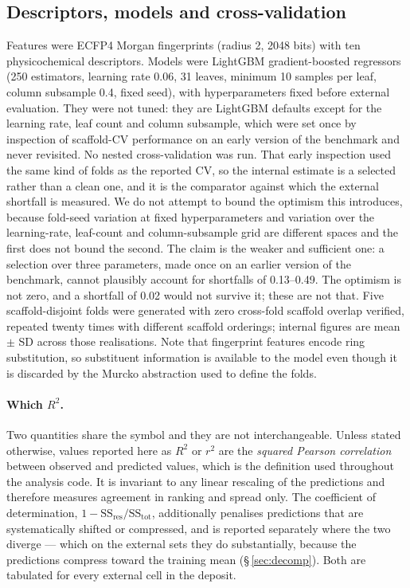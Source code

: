 \documentclass[11pt,a4paper]{article}
\begin{document}
\subsection{Descriptors, models and cross-validation}
Features were ECFP4 Morgan fingerprints \cite{Rogers2010} (radius 2, 2048 bits) with ten
physicochemical descriptors. Models were LightGBM \cite{Ke2017} gradient-boosted regressors (250 estimators, learning
rate 0.06, 31 leaves, minimum 10 samples per leaf, column subsample 0.4, fixed seed),
with hyperparameters fixed before external evaluation. They were not tuned: they are
LightGBM defaults except for the learning rate, leaf count and column subsample, which
were set once by inspection of scaffold-CV performance on an early version of the
benchmark and never revisited. No nested cross-validation was run. That early inspection
used the same kind of folds as the reported CV, so the internal estimate is a selected
rather than a clean one, and it is the comparator against which the external shortfall is
measured. We do not attempt to bound the optimism this
introduces, because fold-seed variation at fixed hyperparameters and variation over the
learning-rate, leaf-count and column-subsample grid are different spaces and the first
does not bound the second. The claim is the weaker and sufficient one: a selection over
three parameters, made once on an earlier version of the benchmark, cannot plausibly
account for shortfalls of 0.13--0.49. The optimism is not zero, and a shortfall of 0.02
would not survive it; these are not that. Five scaffold-disjoint folds
were generated with zero cross-fold scaffold overlap verified, repeated twenty times
with different scaffold orderings; internal figures are mean $\pm$ SD across those
realisations. Note that fingerprint features encode ring substitution, so substituent
information is available to the model even though it is discarded by the Murcko
abstraction used to define the folds.

\paragraph{Which $R^{2}$.} Two quantities share the symbol and they are not
interchangeable. Unless stated otherwise, values reported here as $R^{2}$ or $r^{2}$
are the \emph{squared Pearson correlation} between observed and predicted values, which
is the definition used throughout the analysis code. It is invariant to any linear
rescaling of the predictions and therefore measures agreement in ranking and spread
only. The coefficient of determination, $1-\mathrm{SS_{res}}/\mathrm{SS_{tot}}$,
additionally penalises predictions that are systematically shifted or compressed, and
is reported separately where the two diverge --- which on the external sets they do
substantially, because the predictions compress toward the training mean
(\S\,\ref{sec:decomp}). Both are tabulated for every external cell in the deposit.
\end{document}
